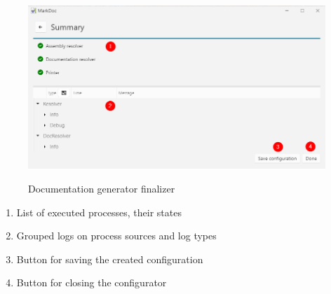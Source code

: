 \begin{figure}[H]
    \caption{Documentation generator finalizer}
    \includegraphics[width=\linewidth]{img/markDocFinalizer.png}
    \label{fig:finalizerPage}
\end{figure}

\begin{enumerate}
    \item List of executed processes, their states
    \item Grouped logs on process sources and log types
    \item Button for saving the created configuration
    \item Button for closing the configurator
\end{enumerate}